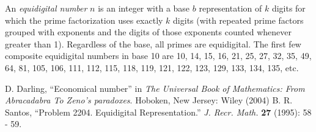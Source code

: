 \documentclass[12pt]{article}
\begin{document}
An {\em equidigital number} $n$ is an integer with a base $b$ representation of $k$ digits for which the prime factorization uses exactly $k$ digits (with repeated prime factors grouped with exponents and the digits of those exponents counted whenever greater than 1). Regardless of the base, all primes are equidigital. The first few composite equidigital numbers in base 10 are 10, 14, 15, 16, 21, 25, 27, 32, 35, 49, 64, 81, 105, 106, 111, 112, 115, 118, 119, 121, 122, 123, 129, 133, 134, 135, etc.

\begin{thebibliography}{1}
 D. Darling, ``Economical number'' in {\it The Universal Book of Mathematics: From Abracadabra To Zeno's paradoxes}. Hoboken, New Jersey: Wiley (2004)
 B. R. Santos, ``Problem 2204. Equidigital Representation.'' {\it J. Recr. Math.} {\bf 27} (1995): 58 - 59. 
\end{thebibliography}
\end{document}
